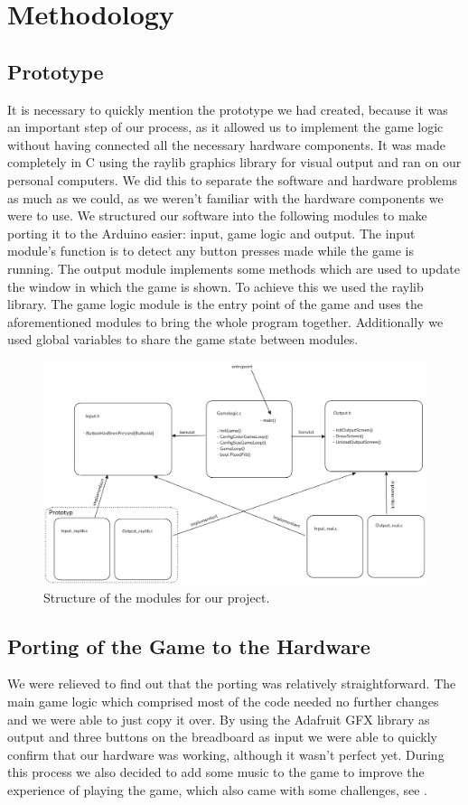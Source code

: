 \documentclass[10pt, a4paper]{article}
\begin{document}
\section*{Methodology}

\subsection*{Prototype}

It is necessary to quickly mention the prototype we had created, because it was an important step of our process, as it allowed us to implement the game logic without having connected all the necessary hardware components. It was made completely in C using the raylib graphics library for visual output and ran on our personal computers. We did this to separate the software and hardware problems as much as we could, as we weren't familiar with the hardware components we were to use. We structured our software into the following modules to make porting it to the Arduino easier: input, game logic and output. The input module's function is to detect any button presses made while the game is running. The output module implements some methods which are used to update the window in which the game is shown. To achieve this we used the raylib library. The game logic module is the entry point of the game and uses the aforementioned modules to bring the whole program together. Additionally we used global variables to share the game state between modules.

\begin{figure}
\centering
\includegraphics[width=\textwidth]{module_structure.png}
\caption{Structure of the modules for our project.}
\end{figure}


\subsection*{Porting of the Game to the Hardware}
We were relieved to find out that the porting was relatively straightforward. The main game logic which comprised most of the code needed no further changes and we were able to just copy it over. By using the Adafruit GFX library as output and three buttons on the breadboard as input we were able to quickly confirm that our hardware was working, although it wasn't perfect yet. During this process we also decided to add some music to the game to improve the experience of playing the game, which also came with some challenges, see .
\end{document}
